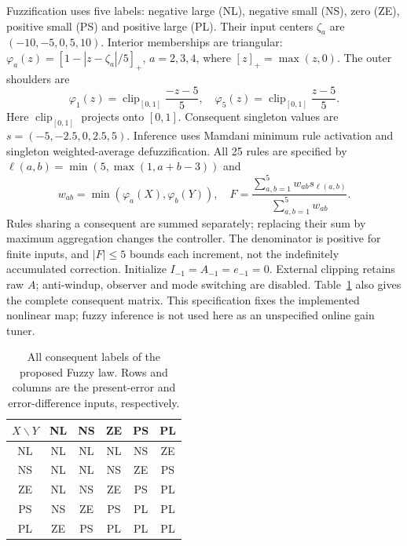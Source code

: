 Fuzzification uses five labels: negative large (NL), negative small (NS), zero (ZE),
positive small (PS) and positive large (PL). Their input centers $\zeta_a$ are
$(-10,-5,0,5,10)$. Interior memberships are triangular:
$\varphi_a(z)=[1-|z-\zeta_a|/5]_+$, $a=2,3,4$, where
$[z]_+=\max(z,0)$. The outer shoulders are
\begin{equation}
 \varphi_1(z)=\operatorname{clip}_{[0,1]}\frac{-z-5}{5},\quad
 \varphi_5(z)=\operatorname{clip}_{[0,1]}\frac{z-5}{5}.
\end{equation}
Here $\operatorname{clip}_{[0,1]}$ projects onto $[0,1]$.
Consequent singleton values are $s=(-5,-2.5,0,2.5,5)$.
Inference uses Mamdani minimum rule activation and singleton
weighted-average defuzzification. All 25 rules are specified by
$\ell(a,b)=\min(5,\max(1,a+b-3))$ and
\begin{equation}
 w_{ab}=\min(\varphi_a(X),\varphi_b(Y)),\quad
 F=\frac{\sum_{a,b=1}^5w_{ab}s_{\ell(a,b)}}{\sum_{a,b=1}^5w_{ab}}.
 \label{eq:fpi_rules}
\end{equation}
Rules sharing a consequent are summed separately; replacing their
sum by maximum aggregation changes the controller. The denominator
is positive for finite inputs, and $|F|\le5$ bounds each increment,
not the indefinitely accumulated correction. Initialize
$I_{-1}=A_{-1}=e_{-1}=0$. External clipping retains raw $A$;
anti-windup, observer and mode switching are disabled.
Table~\ref{tab:fpi_full_rules} also gives the complete consequent matrix.
This specification fixes the implemented nonlinear map; fuzzy inference
is not used here as an unspecified online gain tuner.

\begin{table}[t]
\caption{All consequent labels of the proposed Fuzzy law. Rows and columns
are the present-error and error-difference inputs, respectively.}
\label{tab:fpi_full_rules}
\centering
\begin{tabular}{@{}c|ccccc@{}}\toprule
$X\backslash Y$ & NL & NS & ZE & PS & PL\\\midrule
NL & NL & NL & NL & NS & ZE\\
NS & NL & NL & NS & ZE & PS\\
ZE & NL & NS & ZE & PS & PL\\
PS & NS & ZE & PS & PL & PL\\
PL & ZE & PS & PL & PL & PL\\\bottomrule
\end{tabular}
\end{table}

